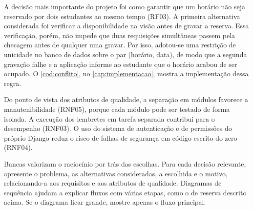 A decisão mais importante do projeto foi como garantir que um horário não seja
reservado por dois estudantes ao mesmo tempo (RF03). A primeira alternativa
considerada foi verificar a disponibilidade na visão antes de gravar a
reserva. Essa verificação, porém, não impede que duas requisições simultâneas
passem pela checagem antes de qualquer uma gravar. Por isso, adotou-se uma
restrição de unicidade no banco de dados sobre o par (horário, data), de modo
que a segunda gravação falhe e a aplicação informe ao estudante que o horário
acabou de ser ocupado. O \cref{cod:conflito}, no \cref{cap:implementacao},
mostra a implementação dessa regra.

Do ponto de vista dos atributos de qualidade, a separação em módulos favorece
a manutenibilidade (RNF05), porque cada módulo pode ser testado de forma
isolada. A execução dos lembretes em tarefa separada contribui para o
desempenho (RNF03). O uso do sistema de autenticação e de permissões do
próprio Django reduz o risco de falhas de segurança em código escrito do zero
(RNF04).

\begin{instrucao}
Bancas valorizam o raciocínio por trás das escolhas. Para cada decisão
relevante, apresente o problema, as alternativas consideradas, a escolhida e o
motivo, relacionando-a aos requisitos e aos atributos de qualidade. Diagramas
de sequência ajudam a explicar fluxos com várias etapas, como o de reserva
descrito acima. Se o diagrama ficar grande, mostre apenas o fluxo principal.
\end{instrucao}
